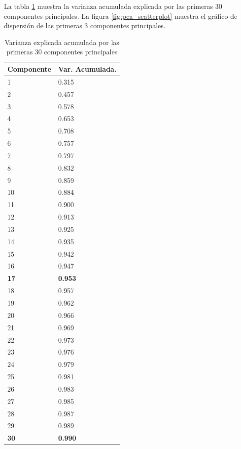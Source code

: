 \documentclass[journal]{IEEEtran}
\begin{document}
La tabla \ref{table:pca_results} muestra la varianza acumulada explicada 
por las primeras 30 componentes principales. La figura \ref{fig:pca_scatterplot}
muestra el gráfico de dispersión de las primeras 3 componentes principales.

\begin{table}[ht!]
\label{table:pca_results}
\caption{Varianza explicada acumulada por las primeras 30 componentes principales}
\centering
\begin{tabular}{l | l }
Componente & Var. Acumulada.  \\
\hline
 1  &  0.315 \\
 2  &  0.457  \\
 3  &  0.578  \\
 4  &  0.653  \\
 5  &  0.708  \\
 6  &  0.757  \\
 7  &  0.797  \\
 8  &  0.832  \\
 9  &  0.859  \\
10  &  0.884  \\
11  &  0.900 \\
12  &  0.913  \\
13  &  0.925 \\
14  &  0.935  \\
15  &  0.942  \\
16  &  0.947  \\
\textbf{17}  &  \textbf{0.953}  \\
18  &  0.957 \\
19  &  0.962  \\
20  &  0.966  \\
21  &  0.969  \\
22  &  0.973  \\
23  &  0.976  \\
24  &  0.979  \\
25  &  0.981  \\
26  &  0.983  \\
27  &  0.985  \\
28  &  0.987  \\
29  &  0.989  \\
\textbf{30}  &  \textbf{0.990}  \\
\end{tabular}
\end{table}
\end{document}
